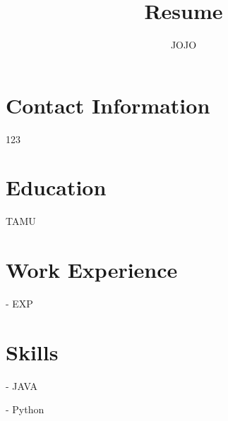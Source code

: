 \documentclass{article}
\begin{document}
\title{Resume}
\author{ JOJO }
\date{}

\maketitle

\section*{Contact Information}
123

\section*{Education}
TAMU

\section*{Work Experience}

- EXP


\section*{Skills}

- JAVA

- Python
\end{document}
